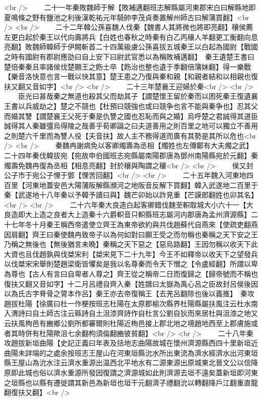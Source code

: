 <br />
　　二十一年秦敗魏師于解【敗補邁翻班志解縣屬河東郡宋白曰解縣地即夏鳴條之野有鹽池之利後漢乾祐元年騎帥李茂貞奏置解州師古曰解蒲買翻】<br />
<br />
　　二十二年韓公孫喜魏人伐秦【魏書人其將微也將即亮翻】穰侯薦左更白起於秦王以代向壽將兵【白姓也春秋之時秦有白乙丙穰人羊翻更工衡翻向息亮翻】敗魏師韓師于伊闕斬首二十四萬級虜公孫喜拔五城秦王以白起為國尉【戰國之時有國尉有郡尉應劭曰自上安下曰尉武官悉以為稱敗補邁翻】　秦王遺楚王書曰楚倍秦秦且率諸侯伐楚願王之飭士卒【飭治也整也遺于季翻倍蒲妹翻】得一樂戰【樂音洛快意也言一戰以快其意】楚王患之乃復與秦和親【和親者結和以相親也復扶又翻又音如字】<br />
<br />
　　二十三年楚襄王迎婦於秦<br />
<br />
　　臣光曰甚哉秦之無道也殺其父而劫其子【謂楚懷王留於秦而以困死秦王復遺襄王書以兵威劫之】楚之不競也【杜預曰競強也或曰競争也言不能與秦争也】忍其父而婚其讐【謂楚襄王父死于秦是仇讐之國也忍恥而與之婚】烏呼楚之君誠得其道臣誠得其人秦雖彊烏得陵之哉善乎荀卿論之曰夫道善用之則百里之地可以獨立不善用之則楚六千里而為讐人役【夫音扶】故人主不務得道而廣有其勢是其所以危也<br />
<br />
　　秦魏冉謝病免以客卿燭壽為丞相【燭姓也左傳鄭有大夫燭之武】二十四年秦伐韓拔宛【宛故申伯國班志宛縣屬南陽郡唐為鄧州南陽縣宛於元翻】秦燭壽免魏冉復為丞相【相息亮翻】封於穰與陶謂之穰<br />
<br />
　　侯又封公子市于宛公子悝于鄧【悝苦回翻】<br />
<br />
　　二十五年魏入河東地四百里【河東地蓋安邑大陽蒲阪解縣瀕河之地阪音反解下買翻】韓入武遂地二百里于秦【武遂地十八年秦以予韓予讀曰與】魏芒卯始以詐見重【芒謨郎翻姓也卯其名】<br />
<br />
　　二十六年秦大良造白起客卿錯伐魏至軹取城大小六十一【大良造即大上造之良者大上造秦十六爵軹音只軹縣班志屬河内郡唐為孟州濟源縣】二十七年冬十月秦王稱西帝遣使立齊王為東帝欲約與共伐趙蘇代自燕來【使疏吏翻燕因肩翻】齊王曰秦使魏冉致帝子以為何如對曰願王受之而勿稱也秦稱之天下安之王乃稱之無後也【無後猶言未晩】秦稱之天下惡之【惡烏路翻】王因勿稱以收天下此大資也且伐趙孰與伐桀宋利【桀宋見下二十九年】今王不如釋帝以收天下之望發兵以伐桀宋宋舉則楚趙梁衛皆懼矣是我以名尊秦而令天下憎之【令盧經翻】所謂以卑為尊也【古人有言曰自卑者人尊之】齊王從之稱帝二日而復歸之【歸帝號而不稱也復扶又翻又音如字】十二月呂禮自齊入秦【姓譜曰太嶽為禹心呂之臣故封呂侯後因以為氏古字脊骨之膂本作呂】秦王亦去帝復稱王【去羌呂翻除也後以義推】　秦攻趙拔杜陽【徐廣曰杜一作梗按班志杜陽在太原郡榆次縣界杜陽縣屬扶風注云杜水南入渭詩曰自土師古注云緜詩自土沮漆齊詩作自杜言公劉自狄而來居杜與沮漆之地又云扶風栒邑有豳鄉公劉所都審爾則杜陽近栒邑接上郡北地之境趙地西至上郡膚施或者其時併有杜陽歟沮七余翻枸須倫翻豳彼貧翻】<br />
<br />
　　二十八年秦攻趙拔新垣曲陽【史記正義曰年表及括地志曲陽故城在懷州濟源縣西四十里新垣近曲陽未詳端的之處余按班志王屋山在河東垣縣沇水所出東流為濟水經濟水出河東垣縣王屋山為沇水注云濟水重源出温西北平地水有二源東源出原城東北晉文公以信降原即此城也俗以濟水重源所發因復謂之濟源城如此則濟源去垣不遠矣蓋新垣即河東之垣縣也以縣有遷徙謂其新邑為新垣也垣干元翻濟子禮翻沇以轉翻降戶江翻重直龍翻復扶又翻】<br />

